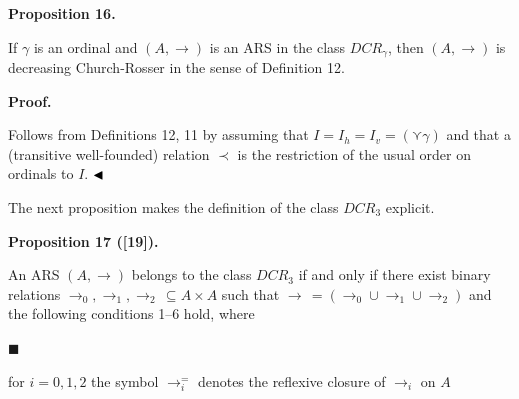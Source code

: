 \documentclass[10pt,a4paper]{amsart}
\begin{document}
 
 
 
\par\medskip\noindent\textbf{Proposition 16.}\par
 
 
If $\gamma$ is an ordinal and $(A,\to)$ is an ARS in the class $DCR_{\gamma}$, then $(A,\to)$ is decreasing Church-Rosser in the sense of Definition 12.\par
 
 
 
 
\par\medskip\noindent\textbf{Proof.}\par
 
 
Follows from Definitions 12, 11 by assuming that $I=I_{h}=I_{v}=(\curlyvee\gamma)$ and that a (transitive well-founded) relation $\prec$ is the restriction of the usual order on ordinals to $I$. $\hfill\blacktriangleleft$\par
 
 
 
The next proposition makes the definition of the class $DCR_{3}$ explicit.\par
 
 
 
\par\medskip\noindent\textbf{Proposition 17 ([19]).}\par
 
 
An ARS $(A,\to)$ belongs to the class $DCR_{3}$ if and only if there exist binary relations $\to_{0},\to_{1},\to_{2}\,\subseteq A\times A$ such that $\to\,=(\to_{0}\cup\to_{1}\cup\to_{2})$ and the following conditions 1–6 hold, where\par
  
\par\noindent  $\blacksquare$ 
 
for $i=0,1,2$ the symbol $\to_{i}^{=}$ denotes the reflexive closure of $\to_{i}$ on $A$\par
 
\end{document}
